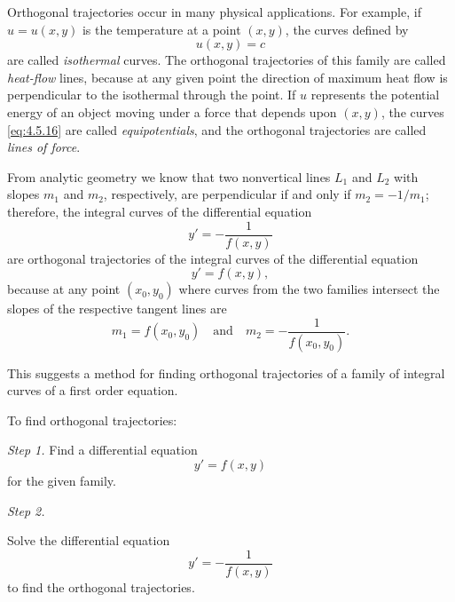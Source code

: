 \documentclass{ximera}
\begin{document}
 
Orthogonal trajectories occur in many physical applications.
For example, if $u=u(x,y)$ is the temperature at a point $(x,y)$,  the
curves defined by
\begin{equation} \label{eq:4.5.16}
u(x,y)=c
\end{equation}
are called \textit{isothermal} curves. The orthogonal trajectories of
this family are called \textit{heat-flow} lines, because at any given
point the direction of maximum heat flow is perpendicular to the
isothermal through the point. If $u$ represents the potential energy
of an object moving under a force that depends upon $(x,y)$,  the
curves \eqref{eq:4.5.16} are called \textit{equipotentials}, and the
orthogonal trajectories are called \textit{lines of force}.
 
From analytic geometry we know that two nonvertical lines $L_1$ and
$L_2$ with slopes $m_1$ and $m_2$, respectively, are perpendicular if
and only if $m_2=-1/m_1$;  therefore, the integral curves of the
differential equation
$$
y'=-\frac{1}{f(x,y)}
$$
are orthogonal trajectories of the integral curves of the differential
equation
$$
y'=f(x,y),
$$
because at any point $(x_0,y_0)$ where curves from the two families
intersect the slopes of the respective tangent lines are
$$
m_1=f(x_0,y_0)\quad\mbox{and}\quad m_2=-\frac{1}{f(x_0,y_0)}.
$$
 
This suggests a  method for finding orthogonal trajectories
of a family of integral curves of a first order equation.
 
\begin{procedure}\label{proc:orthTraj}
To find orthogonal trajectories:

\textit{Step 1.}
Find a differential equation
$$
y'=f(x,y)
$$
 for the given family.
 
\textit{Step 2.}
 
Solve the differential equation
$$
y'=-\frac{1}{f(x,y)}
$$
to find the orthogonal trajectories.

\end{procedure}
 
\end{document}
